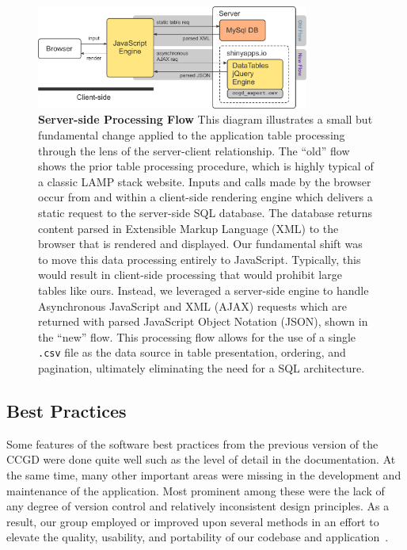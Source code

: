 \documentclass[10pt]{report}
\begin{document}
\begin{figure}[H]
    \center{}
    \includegraphics[width=0.8\textwidth]{fig/parse_flow.pdf}
    \caption[Server-side Processing Flow]{\textbf{Server-side Processing Flow} This diagram illustrates a small but fundamental change applied to the application table processing through the lens of the server-client relationship. The ``old'' flow shows the prior table processing procedure, which is highly typical of a classic LAMP stack website. Inputs and calls made by the browser occur from and within a client-side rendering engine which delivers a static request to the server-side SQL database. The database returns content parsed in Extensible Markup Language (XML) to the browser that is rendered and displayed. Our fundamental shift was to move this data processing entirely to JavaScript. Typically, this would result in client-side processing that would prohibit large tables like ours. Instead, we leveraged a server-side engine to handle Asynchronous JavaScript and XML (AJAX) requests which are returned with parsed JavaScript Object Notation (JSON), shown in the ``new'' flow. This processing flow allows for the use of a single \texttt{.csv} file as the data source in table presentation, ordering, and pagination, ultimately eliminating the need for a SQL architecture.}\label{fig:parseFlow}
\end{figure}

\subsection{Best Practices}
Some features of the software best practices from the previous version of the CCGD were done quite well such as the level of detail in the documentation. At the same time, many other important areas were missing in the development and maintenance of the application. Most prominent among these were the lack of any degree of version control and relatively inconsistent design principles. As a result, our group employed or improved upon several methods in an effort to elevate the quality, usability, and portability of our codebase and application~\cite{finchamSoftwareDevelopmentPractices2011}.
\end{document}
